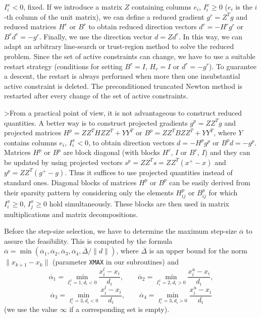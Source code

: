 \documentclass{esub2acm}
\begin{document}
$I^x_i < 0$, fixed. If we introduce a matrix $Z$ containing
columns $e_i$, $I^x_i \geq 0$ ($e_i$ is the $i$-th column of the unit
matrix), we can define a reduced gradient $g^r = Z^T g$ and reduced matrices
$H^r$ or $B^r$ to obtain reduced direction vectors $d^r = -H^r g^r$ or
$B^r d^r = -g^r$. Finally, we use the direction vector $d = Z d^r$. In
this way, we can adapt an arbitrary line-search or trust-region method to
solve the reduced problem. Since the set of active constraints can change,
we have to use a suitable restart strategy (conditions for setting
$B^r = I$, $H_r = I$ or $d^r = -g^r$). To guarantee a descent, the restart
is always performed when more then one insubstantial active constraint is
deleted. The preconditioned truncated Newton method is restarted after
every change of the set of active constraints.

>From a practical point of view, it is not advantageous to construct
reduced quantities. A better way is to construct projected gradients
$g^p = Z Z^T g$ and projected matrices $H^p = Z Z^T H Z Z^T + Y Y^T$
or $B^p = Z Z^T B Z Z^T + Y Y^T$, where $Y$ contains columns $e_i$,
$I^x_i < 0$, to obtain direction vectors $d = -H^p g^p$ or $B^p d = -g^p$.
Matrices $H^p$ or $B^p$ are block diagonal (with blocks $H^r$, $I$ or
$B^r$, $I$) and they can be updated by using projected vectors
$s^p = Z Z^T s = Z Z^T (x^+ - x)$ and $y^p = Z Z^T (g^+ - g)$. Thus
it suffices to use projected quantities instead of standard ones.
Diagonal blocks of matrices $H^p$ or $B^p$ can be easily derived
from their sparsity pattern by considering only the elements $H^p_{ij}$
or $B^p_{ij}$ for which $I^x_i \geq 0$, $I^x_j \geq 0$ hold
simultaneously. %
These blocks are then used in matrix multiplications and matrix
decompositions.

Before the step-size selection, we have to determine the maximum step-size
$\overline{\alpha}$ to assure the feasibility. This is computed by the
formula $\overline{\alpha} = \min(\overline{\alpha}_1, \overline{\alpha}_2,
\overline{\alpha}_3, \overline{\alpha}_4, \overline{\Delta}/\|d\|)$, where
$\overline{\Delta}$ is an upper bound for the norm $\|x_{k+1} - x_k\|$
(parameter {\tt XMAX} in our subroutines) and
%
$$\overline{\alpha}_1 = \min_{I^x_i = 1, d_i < 0} \frac{x^l_i-x_i}{d_i}, \qquad
\overline{\alpha}_2 = \min_{I^x_i = 2, d_i > 0} \frac{x^u_i-x_i}{d_i}, $$
$$\overline{\alpha}_3 = \min_{I^x_i = 3, d_i < 0} \frac{x^l_i-x_i}{d_i}, \qquad
\overline{\alpha}_4 = \min_{I^x_i = 3, d_i > 0} \frac{x^u_i-x_i}{d_i}$$
%
(we use the value $\infty$ if a corresponding set is empty).
\end{document}
